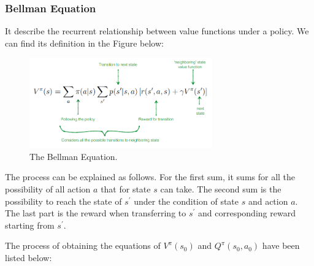 \documentclass[11pt]{article}
\begin{document}
\subsubsection{Bellman Equation}
It describe the recurrent relationship between value functions under a policy. We can find its definition in the Figure below:

\begin{figure}[H]
\centering
    \includegraphics[width=0.7\textwidth]{BE.png}
    \caption{The Bellman Equation.}
	\label{fig:process}
\end{figure}
The process can be explained as follows. For the first sum, it sums for all the possibility of all action $a$ that for state $s$ can take. The second sum is the possibility to reach the state of $s^{'}$ under the condition of state $s$ and action $a$. The last part is the reward when transferring to $s^{'}$ and corresponding reward starting from $s^{'}$.

The process of obtaining the equations of $V^{\pi}(s_0)$ and $Q^{\pi}(s_0, a_0)$ have been listed below: 
\end{document}
